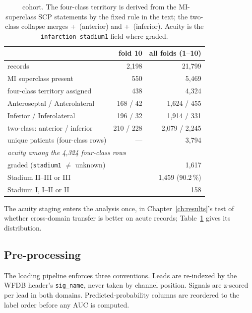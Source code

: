 \begin{table}[tb]
\centering\small
\caption{\ptbxl\ cohort. The four-class territory is derived from the MI-superclass SCP statements by the fixed rule in the text; the two-class collapse merges \AS+\AL\ (anterior) and \INF+\IL\ (inferior). Acuity is the \texttt{infarction\_stadium1} field where graded.}
\label{tab:ptbxl}
\begin{tabular}{lrr}
\toprule
 & fold 10 & all folds (1--10) \\
\midrule
records & 2,198 & 21,799 \\
MI superclass present & 550 & 5,469 \\
four-class territory assigned & 438 & 4,324 \\
\quad Anteroseptal / Anterolateral & 168 / 42 & 1,624 / 455 \\
\quad Inferior / Inferolateral & 196 / 32 & 1,914 / 331 \\
\quad two-class: anterior / inferior & 210 / 228 & 2,079 / 2,245 \\
unique patients (four-class rows) & --- & 3,794 \\
\midrule
\multicolumn{3}{l}{\emph{acuity among the 4,324 four-class rows}}\\
graded (\texttt{stadium1} $\neq$ unknown) & & 1,617 \\
\quad Stadium II--III or III & & 1,459 (90.2\,\%) \\
\quad Stadium I, I--II or II & & 158 \\
\bottomrule
\end{tabular}
\end{table}

The acuity staging enters the analysis once, in Chapter~\ref{ch:results}'s test of whether cross-domain transfer is better on acute records; Table~\ref{tab:ptbxl} gives its distribution. 

\subsection{Pre-processing}
\label{sec:preproc}

The loading pipeline enforces three conventions. Leads are re-indexed by the WFDB header's \texttt{sig\_name}, never taken by channel position. Signals are z-scored per lead in both domains. Predicted-probability columns are reordered to the label order before any AUC is computed. 

